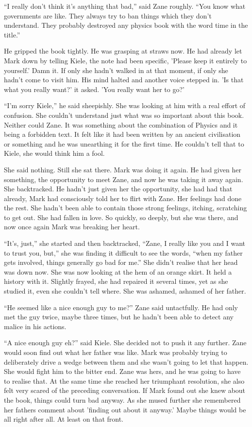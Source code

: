 ``I really don't think it's anything that bad,'' said Zane roughly.  ``You know what governments are like.  They always try to ban things which they don't understand.  They probably destroyed any physics book with the word time in the title.''  

He gripped the book tightly.  He was grasping at straws now.  He had already let Mark down by telling Kiele, the note had been specific, 'Please keep it entirely to yourself.'  Damn it.  If only she hadn't walked in at that moment, if only she hadn't come to visit him.  His mind halted and another voice stepped in.  'Is that what you really want?' it asked.  'You really want her to go?'  

``I'm sorry Kiele,'' he said sheepishly.  She was looking at him with a real effort of confusion.  She couldn't understand just what was so important about this book.  Neither could Zane.  It was something about the combination of Physics and it being a forbidden text.  It felt like it had been written by an ancient civilisation or something and he was unearthing it for the first time.  He couldn't tell that to Kiele, she would think him a fool.

She said nothing.  Still she sat there.  Mark was doing it again.  He had given her something, the opportunity to meet Zane, and now he was taking it away again.  She backtracked.  He hadn't just given her the opportunity, she had had that already, Mark had consciously told her to flirt with Zane.  Her feelings had done the rest.  She hadn't been able to contain those strong feelings, itching, scratching to get out.  She had fallen in love.  So quickly, so deeply, but she was there, and now once again Mark was breaking her heart.

``It's, just,'' she started and then backtracked, ``Zane, I really like you and I want to trust you, but,'' she was finding it difficult to see the words, ``when my father gets involved, things generally go bad for me.''  She didn't realise that her head was down now.  She was now looking at the hem of an orange skirt.  It held a history with it.  Slightly frayed, she had repaired it several times, yet as she studied it, even she couldn't tell where.  She was ashamed, ashamed of her father.

``He seemed like a nice enough guy to me?'' Zane said untactfully.  He had only met the guy twice, maybe three times, but he hadn't been able to detect any malice in his actions.  

``A nice enough guy eh?'' said Kiele.  She decided not to push it any further.  Zane would soon find out what her father was like.  Mark was probably trying to deliberately drive a wedge between them and she wasn't going to let that happen.  She would fight him to the bitter end.  Zane was hers, and he was going to have to realise that.  At the same time she reached her triumphant resolution, she also felt very scared of the preceding conversation.  If Mark found out she knew about the book, things could turn bad anyway.  As she mused further she remembered her fathers comment about 'finding out about it anyway.'  Maybe things would be all right after all.  At least on that front.

